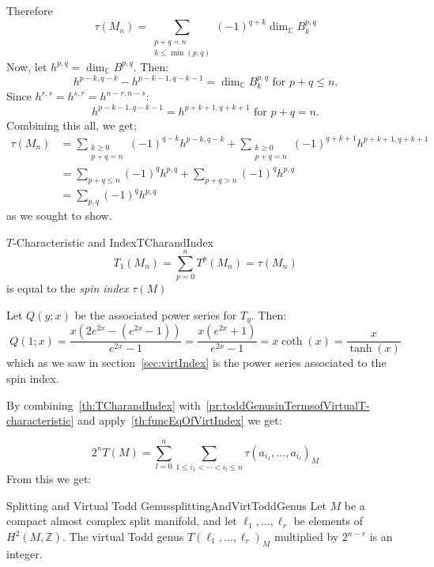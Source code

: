 \documentclass{book}
\newenvironment{Proof}[1][]
  {\begin{ProofTcb}[#1]}
  {\end{ProofTcb}}
\begin{document}
\begin{Proof}
  Therefore
  \[
    \tau(M_n) = \sum_{\substack{p+q=n\\k\le \min(p,q)}} (-1)^{q+k} \dim_{\mathbb{C}} B_k^{p,q}
  \]
  Now, let $h^{p,q} = \dim_{\mathbb{C}} B^{p,q}$. Then:
  \[
      h^{p-k,q-k} - h^{p-k-1,q-k-1} = \dim_{\mathbb{C}} B_k^{p,q} \text{ for } p+q \leq n.
  \]
  Since $h^{r,s} = h^{s,r} = h^{n-r,n-s}$:
  \[
      h^{p-k-1,q-k-1} = h^{p+k+1,q+k+1} \text{ for } p+q=n.
  \]
  Combining this all, we get;
  \begin{align*}
    \tau(M_n) &= \sum_{\substack{k \geq 0 \\ p+q=n}} (-1)^{q-k}h^{p-k,q-k} + \sum_{\substack{k \geq 0 \\ p+q=n}} (-1)^{q+k+1}h^{p+k+1,q+k+1} \\
      &= \sum_{p+q \leq n} (-1)^qh^{p,q} + \sum_{p+q>n} (-1)^qh^{p,q} \\
      &= \sum_{p,q} (-1)^qh^{p,q}
  \end{align*}
  as we sought to show.
\end{Proof}

\begin{thm}{$T$-Characteristic and Index}{TCharandIndex}
\[
  T_{1}(M_n) = \sum_{p=0}^n  T^p(M_n) = \tau(M_n)
\]
is equal to the \emph{spin index} $\tau(M)$%
\end{thm}

\begin{Proof}
  Let $Q(y;x)$ be the associated power series for $T_y$. Then:
  \[
    Q(1;x) = \frac{x(2e^{2x} - (e^{2x} - 1))}{e^{2x} - 1} = \frac{x(e^{2x} + 1)}{e^{2x} - 1} = x\coth(x) = \frac{x}{\tanh(x)}
\]
which as we saw in section~\ref{sec:virtIndex} is the power series associated to the spin index.
\end{Proof}

By combining~\cref{th:TCharandIndex} with~\cref{pr:toddGenusinTermsofVirtualT-characteristic} and
apply~\cref{th:funcEqOfVirtIndex} we get:

\[
2^n T(M) = \sum_{l=0}^n \sum_{1\leq i_1<\cdots<i_l\leq n} \tau(a_{i_1},\ldots,a_{i_l})_M
\]
From this we get:

\begin{thm}{Splitting and Virtual Todd Genus}{splittingAndVirtToddGenus}
Let $M$ be a compact almost complex split manifold, and let $\ell_1,\ldots,\ell_r$ be elements of
$H^2(M,\mathbb{Z})$. The virtual Todd genus $T(\ell_1,\ldots,\ell_r)_M$ multiplied by $2^{n-r}$ is an
integer.
\end{thm}
\end{document}
